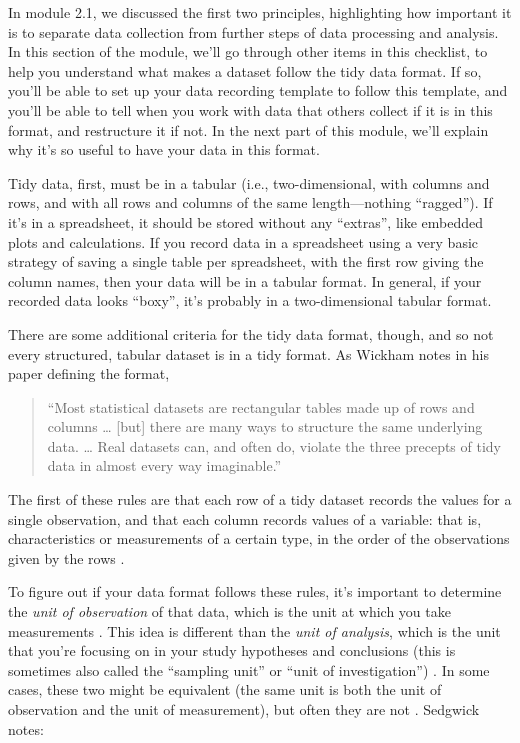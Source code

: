 \documentclass[]{tufte-book}
\begin{document}
In module 2.1, we discussed the first two principles, highlighting how
important it is to separate data collection from further steps of data
processing and analysis. In this section of the module, we'll go through other
items in this checklist, to help you understand what makes a dataset follow the
tidy data format. If so, you'll be able to set up your data recording template
to follow this template, and you'll be able to tell when you work with data that
others collect if it is in this format, and restructure it if not. In the next
part of this module, we'll explain why it's so useful to have your data in this
format.

Tidy data, first, must be in a tabular (i.e., two-dimensional, with columns and
rows, and with all rows and columns of the same length---nothing ``ragged''). If
it's in a spreadsheet, it should be stored without any ``extras'', like embedded
plots and calculations. If you record data in a spreadsheet using a very basic
strategy of saving a single table per spreadsheet, with the first row giving the
column names, then your data will be in a tabular format. In general, if your
recorded data looks ``boxy'', it's probably in a two-dimensional tabular format.

There are some additional criteria for the tidy data format, though, and so
not every structured, tabular dataset is in a tidy format. As Wickham notes
in his paper defining the format,

\begin{quote}
``Most statistical datasets are rectangular tables made up of rows and columns
\ldots{} {[}but{]} there are many ways to structure the same underlying data. \ldots{}
Real datasets can, and often do, violate the three precepts of tidy data in
almost every way imaginable.'' \citep{wickham2014tidy}
\end{quote}

The first of these rules are that each row of a tidy dataset records the
values for a single observation, and that each column records values of a
variable: that is, characteristics or measurements of a certain type, in the
order of the observations given by the rows \citep{wickham2014tidy}.

To figure out if your data format follows these rules, it's important to
determine the \emph{unit of observation} of that data, which is the unit at which you
take measurements \citep{sedgwick2014unit}. This idea is different than the \emph{unit of
analysis}, which is the unit that you're focusing on in your study hypotheses
and conclusions (this is sometimes also called the ``sampling unit'' or ``unit of
investigation'') \citep{altman1997units}. In some cases, these two might be equivalent
(the same unit is both the unit of observation and the unit of measurement), but
often they are not \citep{sedgwick2014unit}. Sedgwick notes:
\end{document}
